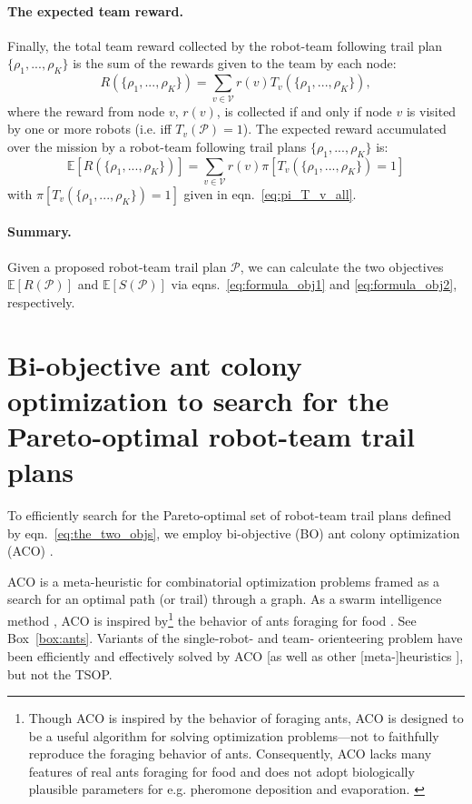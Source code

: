 \documentclass[11pt, oneside]{article}
\begin{document}
\paragraph{The expected team reward.}
Finally, the total team reward collected by the robot-team following trail plan $\{\rho_1, ..., \rho_K\}$ is the sum of the rewards given to the team by each node:
\begin{equation}
R(\{\rho_1,...,\rho_K\}) = \sum_{v\in\mathcal{V}} r(v)  T_v(\{\rho_1, ..., \rho_K\}),
\end{equation} where the reward from node $v$, $r(v)$, is collected if and only if node $v$ is visited by one or more robots (i.e. iff $T_v(\mathcal{P})=1$).
The expected reward accumulated over the mission by a robot-team following trail plans $\{\rho_1, ..., \rho_K\}$ is:
\begin{equation}
	\mathbb{E}[R(\{\rho_1,...,\rho_K\})]= \sum_{v\in\mathcal{V}} r(v) \pi[T_v(\{\rho_1, ..., \rho_K\}) = 1] \label{eq:formula_obj1}
\end{equation}
with $ \pi[T_v(\{\rho_1, ..., \rho_K\}) = 1]$ given in eqn.~\ref{eq:pi_T_v_all}.

\paragraph{Summary.} Given a proposed robot-team trail plan $\mathcal{P}$, we can calculate the two objectives $\mathbb{E}[R(\mathcal{P})]$ and $\mathbb{E}[S(\mathcal{P})]$ via eqns.~\ref{eq:formula_obj1} and \ref{eq:formula_obj2}, respectively.

\section{Bi-objective ant colony optimization to search for the Pareto-optimal robot-team trail plans}
To efficiently search for the Pareto-optimal set of robot-team trail plans defined by eqn.~\ref{eq:the_two_objs}, we employ bi-objective (BO) ant colony optimization (ACO) \cite{iredi2001bi}. 

ACO \cite{dorigo2006ant,bonabeau1999swarm,blum2005ant} is a meta-heuristic for combinatorial optimization problems framed as a search for an optimal path (or trail) through a graph.
As a swarm intelligence method \cite{bonabeau1999swarm}, ACO is inspired by\footnote{
Though ACO is inspired by the behavior of foraging ants, ACO is designed to be a useful algorithm for solving optimization problems---not to faithfully reproduce the foraging behavior of ants. 
Consequently, ACO lacks many features of real ants foraging for food and does not adopt biologically plausible parameters for e.g. pheromone deposition and evaporation. \cite{bonabeau1999swarm}
}
 the behavior of ants foraging for food \cite{bonabeau2000inspiration}. See Box~\ref{box:ants}. 
Variants of the single-robot- and team- orienteering problem have been efficiently and effectively solved by ACO \cite{ke2008ants,chen2015multiobjective,verbeeck2017time,sohrabi2021acs,chen2022environment,montemanni2011enhanced} [as well as other [meta-]heuristics \cite{gavalas2014survey,dang2013effective,chao1996fast,butt1994heuristic}], but not the TSOP.
\end{document}

